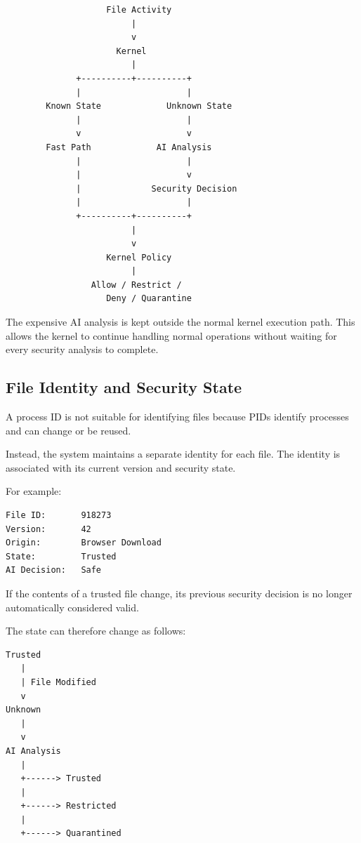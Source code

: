 \begin{verbatim}
                    File Activity
                         |
                         v
                      Kernel
                         |
              +----------+----------+
              |                     |
        Known State             Unknown State
              |                     |
              v                     v
        Fast Path             AI Analysis
              |                     |
              |                     v
              |              Security Decision
              |                     |
              +----------+----------+
                         |
                         v
                    Kernel Policy
                         |
                 Allow / Restrict /
                    Deny / Quarantine
\end{verbatim}

The expensive AI analysis is kept outside the normal kernel execution path. This allows the kernel to continue handling normal operations without waiting for every security analysis to complete.

\subsection{File Identity and Security State}

A process ID is not suitable for identifying files because PIDs identify processes and can change or be reused.

Instead, the system maintains a separate identity for each file. The identity is associated with its current version and security state.

For example:

\begin{verbatim}
File ID:       918273
Version:       42
Origin:        Browser Download
State:         Trusted
AI Decision:   Safe
\end{verbatim}

If the contents of a trusted file change, its previous security decision is no longer automatically considered valid.

The state can therefore change as follows:

\begin{verbatim}
Trusted
   |
   | File Modified
   v
Unknown
   |
   v
AI Analysis
   |
   +------> Trusted
   |
   +------> Restricted
   |
   +------> Quarantined
\end{verbatim}

